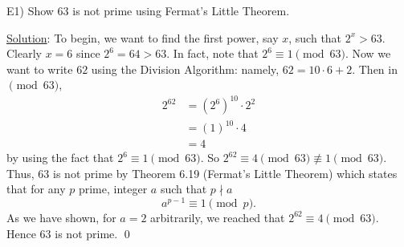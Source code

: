 \documentclass{article}
\begin{document}
E1) Show $63$ is not prime using Fermat's Little Theorem. 

\underline{Solution}: To begin, we want to find the first power, say $x$, such that $2^x > 63$. Clearly $x = 6$ since $2^6 = 64 > 63$. In fact, note that $2^6 \equiv 1 \pmod {63}$. Now we want to write $62$ using the Division Algorithm: namely, $62 = 10 \cdot 6 + 2$. Then in $\pmod {63}$,
\begin{align*}
	2^{62}  &= (2^6)^{10} \cdot 2^2 \\
	&= (1)^{10} \cdot 4 \\
	&= 4
\end{align*} 
by using the fact that $2^{6} \equiv 1 \pmod {63}$.
So $2^{62} \equiv 4 \pmod {63} \not\equiv 1 \pmod {63}$. Thus, $63$ is not prime by Theorem 6.19 (Fermat's Little Theorem) which states that for any $p$ prime, integer $a$ such that $p \nmid a$
$$a^{p-1} \equiv 1 \pmod p. $$
As we have shown, for $a = 2$ arbitrarily, we reached that $2^{62} \equiv 4 \pmod {63}$. Hence $63$ is not prime. \qed \\ 
\end{document}
